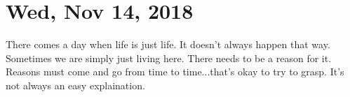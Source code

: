 \section{Wed, Nov 14, 2018}

There comes a day when life is just life. It doesn't always happen that way.
Sometimes we are simply just living here. There needs to be a reason for it. Reasons
must come and go from time to time...that's okay to try to grasp. It's not always an
easy explaination.